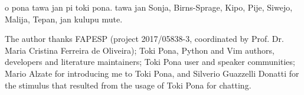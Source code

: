o pona tawa jan pi toki pona.
tawa jan Sonja, Birns-Sprage, Kipo, Pije,
Siwejo, Malija, Tepan, jan kulupu mute.

\begin{acks}

The author thanks
FAPESP (project 2017/05838-3, coordinated by Prof. Dr. Maria Cristina Ferreira de Oliveira);
Toki Pona, Python and Vim authors, developers and literature maintainers;
Toki Pona user and speaker communities; 
Mario Alzate for introducing me to Toki Pona,
and Silverio Guazzelli Donatti for the stimulus that resulted
from the usage of Toki Pona for chatting.

\end{acks}



